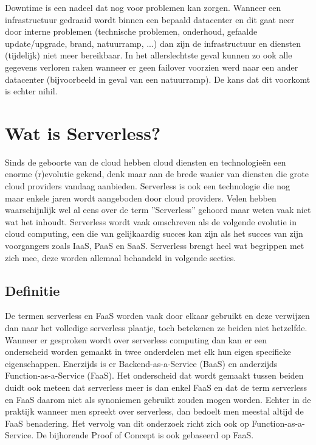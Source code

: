 \begin{description}[style=unboxed, labelwidth=\linewidth, listparindent =0pt]
        \item [Downtime]
        Downtime is een nadeel dat nog voor problemen kan zorgen. Wanneer een infrastructuur gedraaid wordt binnen een bepaald datacenter en dit gaat neer door interne problemen (technische problemen, onderhoud, gefaalde update/upgrade, brand, natuurramp, ...) dan zijn de infrastructuur en diensten (tijdelijk) niet meer bereikbaar. In het allerslechtste geval kunnen zo ook alle gegevens verloren raken wanneer er geen failover voorzien werd naar een ander datacenter (bijvoorbeeld in geval van een natuurramp). De kans dat dit voorkomt is echter nihil.
\end{description}
\newpage

\section{Wat is Serverless?}
\label{sec:wat-is-serverless}
Sinds de geboorte van de cloud hebben cloud diensten en technologieën een enorme (r)evolutie gekend, denk maar aan de brede waaier van diensten die grote cloud providers vandaag aanbieden. Serverless  is ook een technologie die nog maar enkele jaren wordt aangeboden door cloud providers. Velen hebben waarschijnlijk wel al eens over de term ''Serverless'' gehoord maar weten vaak niet wat het inhoudt. Serverless wordt vaak omschreven als de volgende evolutie in cloud computing, een die van gelijkaardig succes kan zijn als het succes van zijn voorgangers zoals IaaS, PaaS en SaaS. Serverless brengt heel wat begrippen met zich mee, deze worden allemaal behandeld in volgende secties.
 
\subsection{Definitie}
De termen serverless en FaaS worden vaak door elkaar gebruikt en deze verwijzen dan naar het volledige serverless plaatje, toch betekenen ze beiden niet hetzelfde. Wanneer er gesproken wordt over serverless computing dan kan er een onderscheid worden gemaakt in twee onderdelen met elk hun eigen specifieke eigenschappen. Enerzijds is er Backend-as-a-Service (BaaS) en anderzijds Function-as-a-Service (FaaS). Het onderscheid dat wordt gemaakt tussen beiden duidt ook meteen dat serverless meer is dan enkel FaaS en dat de term serverless en FaaS daarom niet als synoniemen gebruikt zouden mogen worden. Echter in de praktijk wanneer men spreekt over serverless, dan bedoelt men meestal altijd de FaaS benadering. Het vervolg van dit onderzoek richt zich ook op Function-as-a-Service. De bijhorende Proof of Concept is ook gebaseerd op FaaS.\autocite{Roberts2017}

